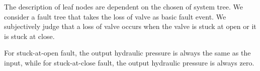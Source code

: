 The description of leaf nodes are dependent on the chosen of system tree\cite{ft02}. 
We consider a fault tree that takes the loss of valve as basic fault event.
We subjectively judge that a loss of valve occurs when the valve is stuck at open or it is stuck at close. 

For stuck-at-open fault, the output hydraulic pressure is always the same as the input, while for stuck-at-close fault, the output hydraulic pressure is always zero.

